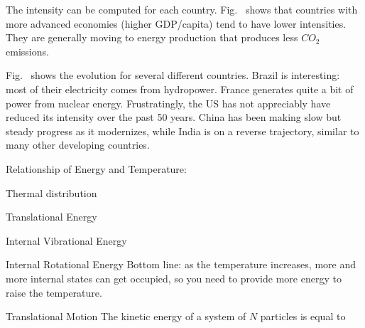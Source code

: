 \documentclass[11pt]{book}
\begin{document}
The intensity can be computed for each country. Fig.~ shows that countries with more advanced economies (higher GDP/capita) tend to have lower intensities. They are generally moving to energy production that produces less $CO_2$ emissions. 

Fig.~ shows the evolution for several different countries. Brazil is interesting: most of their electricity comes from hydropower. France generates quite a bit of power from nuclear energy. Frustratingly, the US has not appreciably have reduced its intensity over the past 50 years. China has been making slow but steady progress as it modernizes, while India is on a reverse trajectory, similar to many other developing countries.



Relationship of Energy and Temperature:
\bei
\item Thermal distribution
\item Translational Energy
\item Internal Vibrational Energy
\item Internal Rotational Energy
\eei
Bottom line: as the temperature increases, more and more internal states can get occupied, so you need to provide more energy to raise the temperature.


\bei
\item Translational Motion
The kinetic energy of a system of $N$ particles is equal to
\end{document}
